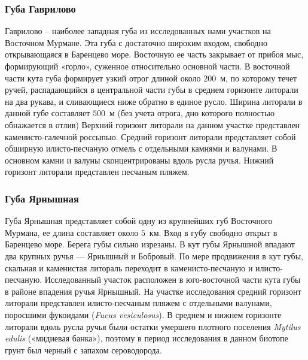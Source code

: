 \subsubsection{Губа Гаврилово}
Гаврилово – наиболее западная губа из исследованных нами участков на Восточном Мурмане. 
Эта   губа   с  достаточно   широким   входом,   свободно   открывающаяся  в  Баренцево море.   
Восточную   ее   часть   закрывает   от   прибоя   мыс,   формирующий   «горло», суженное относительно основной части. 
В восточной части кута губа формирует узкий отрог длиной   около $200$~м, по которому течет ручей, распадающийся в центральной части   губы  в  среднем   горизонте   литорали   на   два   рукава,   и   сливающиеся   ниже   обратно   в единое русло.
Ширина литорали  в  данной губе составляет  $500$~м  (без  учета отрога, дно которого полностью обнажается в отлив) Верхний горизонт литорали на данном участке представлен каменисто-галечной   россыпью.   
Средний   горизонт   литорали   представляет   собой   обширную илисто-песчаную   отмель   с   отдельными   камнями   и   валунами.  
В   основном   камни   и   валуны сконцентрированы   вдоль   русла   ручья.   
Нижний   горизонт   литорали   представлен   песчаным пляжем. 

\subsubsection{Губа Ярнышная}
Губа Ярнышная представляет собой одну из крупнейших губ Восточного Мурмана, ее длина составляет около $5$~км. 
Вход в губу свободно открыт в Баренцево море. 
Берега губы сильно изрезаны. 
В кут губы Ярнышной впадают два крупных ручья --- Ярнышный и Бобровый. 
По мере продвижения в кут губы, скальная и каменистая литораль переходит в каменисто-песчаную и илисто-песчаную. 
Исследованный участок расположен в юго-восточной части кута губы в районе впадения ручья Ярнышный.
На   участке   исследования   средний   горизонт   литорали   представлен   илисто-песчаным пляжем   с   отдельными   валунами,   поросшими   фукоидами   ({\it Fucus   vesiculosus}).   
В   среднем   и нижнем горизонте литорали вдоль русла ручья были остатки умершего плотного поселения  {\it Mytilus edulis} («мидиевая банка»), поэтому в период исследования в данном биотопе грунт был черный с запахом сероводорода.

